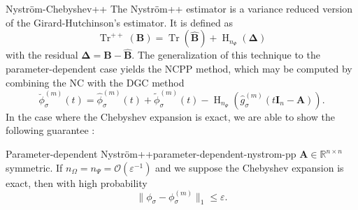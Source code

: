 \documentclass[final, leqno, 12pt]{beamer}
\newcommand{\mtx}[1]{\boldsymbol{#1}}
\DeclareMathOperator{\Tr}{Tr}
\DeclareMathOperator{\Hutch}{H}
\let\oldcite\cite
\renewcommand{\cite}[2][]{\textcolor{linkcolor}{\oldcite{#2}}}
\begin{document}
\begin{frame}[t]
\begin{columns}[t]
    \begin{column}{0.3\paperwidth}

        \begin{block}{Nystr\"om-Chebyshev++}
            The Nystr\"om++ estimator is a variance reduced version
            of the Girard-Hutchinson's estimator. It is defined as
            \begin{equation}
                \Tr^{++}(\mtx{B}) = \Tr(\widehat{\mtx{B}}) + \Hutch_{n_{\Psi}}(\mtx{\Delta})
            \end{equation}
            with the residual $\mtx{\Delta} = \mtx{B} - \widehat{\mtx{B}}$.
            The generalization of this technique to the
            parameter-dependent case yields the \gls{NCPP} method, which 
            may be computed by combining the \gls{NC} with the \gls{DGC} method
            \begin{equation}
                \boxed{\breve{\phi}_{\sigma}^{(m)}(t) = \widehat{\phi}_{\sigma}^{(m)}(t) + \widetilde{\phi}_{\sigma}^{(m)}(t) - \Hutch_{n_{\Psi}}(\widehat{g}_{\sigma}^{(m)}(t\mtx{I}_n - \mtx{A})).}
            \end{equation}
        In the case where the Chebyshev expansion is exact,
        we are able to show the following guarantee \cite{he2023parameter}:
        \begin{thm}{Parameter-dependent Nystr\"om++}{parameter-dependent-nystrom-pp}
            $\mtx{A} \in \mathbb{R}^{n \times n}$ symmetric. If $n_{\Omega} = n_{\Psi} = \mathcal{O}\left( \varepsilon^{-1} \right)$
            and we suppose the Chebyshev expansion is exact, then with high probability
            \begin{equation*}
                \lVert \phi_{\sigma} - \phi_{\sigma}^{(m)} \rVert _1 \leq \varepsilon.
            \end{equation*}
        \end{thm}
    \end{block}

    \end{column}


\end{columns}
\end{frame}
\end{document}
